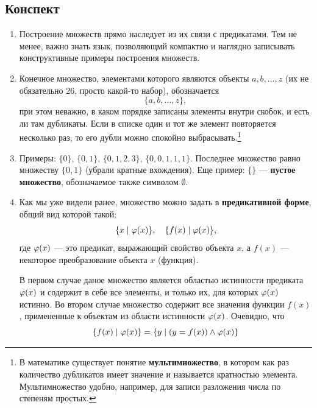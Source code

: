 \subsection*{Конспект}
\begin{enumerate}
\item Построение множеств прямо наследует из их связи с предикатами. Тем не менее, важно знать язык, позволяющмй компактно и наглядно записывать конструктивные примеры построения множеств.
\item Конечное множество, элементами которого являются объекты $a,b,\dots,z$ (их не обязательно 26, просто какой-то набор), обозначается
$$
\{a,b,\dots,z\},
$$
при этом неважно, в каком порядке записаны элементы внутри скобок, и есть ли там дубликаты. Если в списке один и тот же элемент повторяется несколько раз, то его дубли можно спокойно выбрасывать.\footnote{В математике существует понятие \textbf{мультимножество}, в котором как раз количество дубликатов имеет значение и называется кратностью элемента. Мультимножество удобно, например, для записи разложения числа по степеням простых.}
\item Примеры: $\{0\}$, $\{0,1\}$, $\{0,1,2,3\}$, $\{0,0,1,1,1\}$. Последнее множество равно множеству $\{0,1\}$ (убрали кратные вхождения). Еще пример: $\{\}$ --- \textbf{пустое множество}, обозначаемое также символом $\emptyset$.
\item Как мы уже видели ранее, множество можно задать в \textbf{предикативной форме}, общий вид которой такой:
$$
\{x\mid \varphi(x)\},\quad \{f(x)\mid \varphi(x)\},
$$
где $\varphi(x)$ --- это предикат, выражающий свойство объекта $x$, а $f(x)$ --- некоторое преобразование объекта $x$ (функция). 

В первом случае даное множество является областью истинности предиката $\varphi(x)$ и содержит в себе все элементы, и только их, для которых $\varphi(x)$ истинно. Во втором случае множество содержит все значения функции $f(x)$, примененные к объектам из области истинности $\varphi(x)$. Очевидно, что
$$
\{f(x)\mid \varphi(x)\} = \{y\mid(y=f(x))\land\varphi(x)\}
$$


\end{enumerate}
